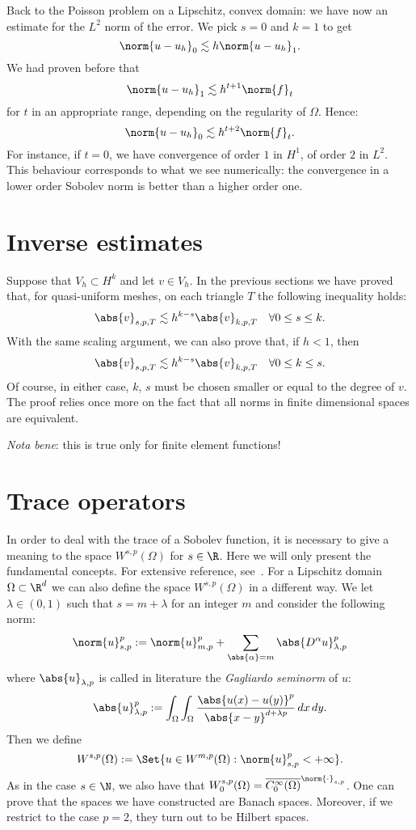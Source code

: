 \begin{example}
Back to the Poisson problem on a Lipschitz, convex domain: we have now an estimate for the $L^2$ norm of the error. We pick $s = 0$ and $k=1$ to get
\[
\norm{u-u_h}_0 \lesssim h \norm{u-u_h}_1.
\]
We had proven before that
\[
\norm{u-u_h}_1 \lesssim h^{t+1} \norm{f}_t
\]
for $t$ in an appropriate range, depending on the regularity of $\Omega$. Hence:
\[
\norm{u-u_h}_0 \lesssim h^{t+2} \norm{f}_t.
\]
For instance, if $t=0$, we have convergence of order $1$ in $H^1$, of order $2$ in $L^2$. This behaviour corresponds to what we see numerically: the convergence in a lower order Sobolev norm is better than a higher order one.
\end{example}


\section{Inverse estimates}
Suppose that $V_h \subset H^k$ and let $v \in V_h$. In the previous sections we have proved that, for quasi-uniform meshes, on each triangle $T$ the following inequality holds:
\[
\abs{v}_{s,p,T} \lesssim h^{k-s} \abs{v}_{k,p,T} \quad \forall 0 \le s \le k.
\]
With the same scaling argument, we can also prove that, if $h<1$, then
\[
\abs{v}_{s,p,T} \lesssim h^{k-s} \abs{v}_{k,p,T} \quad \forall 0 \le k \le s.
\]
Of course, in either case, $k$, $s$ must be chosen smaller or equal to the degree of $v$. The proof relies once more on the fact that all norms in finite dimensional spaces are equivalent.

\emph{Nota bene}: this is true only for finite element functions!

\section{Trace operators}\label{sec:trace_operators}
In order to deal with the trace of a Sobolev function, it is necessary to give a meaning to the space $W^{s,p}(\Omega)$ for $s\in \R$. Here we will only present the fundamental concepts. For extensive reference, see~\cite{fract_sob}. For a Lipschitz domain $\Omega \subset \R^d$ we can also define the space $W^{s,p}(\Omega)$ in a different way. We let $\lambda \in (0,1)$ such that $s = m+\lambda$ for an integer $m$ and consider the following norm:
\[
\norm{u}_{s,p}^p := \norm{u}_{m,p}^p + \sum_{\abs{\alpha}=m} \abs{D^\alpha u}^p_{\lambda,p}
\]
where $\abs{u}_{\lambda,p}$ is called in literature the \emph{Gagliardo seminorm} of $u$:
\[
\abs{u}^p_{\lambda,p} := \int_{\Omega} \int_{\Omega} \frac{\abs{u(x)-u(y)}^p}{\abs{x-y}^{d+\lambda p}} \,dx \,dy.
\]
Then we define
\[
W^{s,p}(\Omega) := \Set{u \in W^{m,p}(\Omega) : \norm{u}_{s,p}^p < +\infty}.
\]
As in the case $s \in \N$, we also have that $W^{s,p}_0(\Omega) = \overline{C^\infty_0(\Omega)}^{\norm{\cdot}_{s,p}}$. One can prove that the spaces we have constructed are Banach spaces. Moreover, if we restrict to the case $p=2$, they turn out to be Hilbert spaces.


